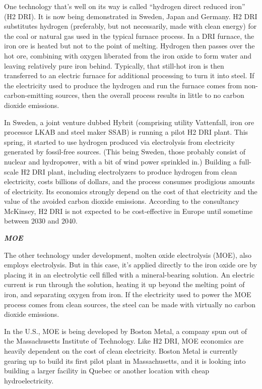 \documentclass[
]{book}
\begin{document}
One technology that's well on its way is called ``hydrogen direct reduced iron'' (H2 DRI). It is now being demonstrated in Sweden, Japan and Germany. H2 DRI substitutes hydrogen (preferably, but not necessarily, made with clean energy) for the coal or natural gas used in the typical furnace process. In a DRI furnace, the iron ore is heated but not to the point of melting. Hydrogen then passes over the hot ore, combining with oxygen liberated from the iron oxide to form water and leaving relatively pure iron behind. Typically, that still-hot iron is then transferred to an electric furnace for additional processing to turn it into steel. If the electricity used to produce the hydrogen and run the furnace comes from non-carbon-emitting sources, then the overall process results in little to no carbon dioxide emissions.

In Sweden, a joint venture dubbed Hybrit (comprising utility Vattenfall, iron ore processor LKAB and steel maker SSAB) is running a pilot H2 DRI plant. This spring, it started to use hydrogen produced via electrolysis from electricity generated by fossil-free sources. (This being Sweden, those probably consist of nuclear and hydropower, with a bit of wind power sprinkled in.) Building a full-scale H2 DRI plant, including electrolyzers to produce hydrogen from clean electricity, costs billions of dollars, and the process consumes prodigious amounts of electricity. Its economics strongly depend on the cost of that electricity and the value of the avoided carbon dioxide emissions. According to the consultancy McKinsey, H2 DRI is not expected to be cost-effective in Europe until sometime between 2030 and 2040.

\textbf{\emph{MOE}}

The other technology under development, molten oxide electrolysis (MOE), also employs electrolysis. But in this case, it's applied directly to the iron oxide ore by placing it in an electrolytic cell filled with a mineral-bearing solution. An electric current is run through the solution, heating it up beyond the melting point of iron, and separating oxygen from iron. If the electricity used to power the MOE process comes from clean sources, the steel can be made with virtually no carbon dioxide emissions.

In the U.S., MOE is being developed by Boston Metal, a company spun out of the Massachusetts Institute of Technology. Like H2 DRI, MOE economics are heavily dependent on the cost of clean electricity. Boston Metal is currently gearing up to build its first pilot plant in Massachusetts, and it is looking into building a larger facility in Quebec or another location with cheap hydroelectricity.
\end{document}
